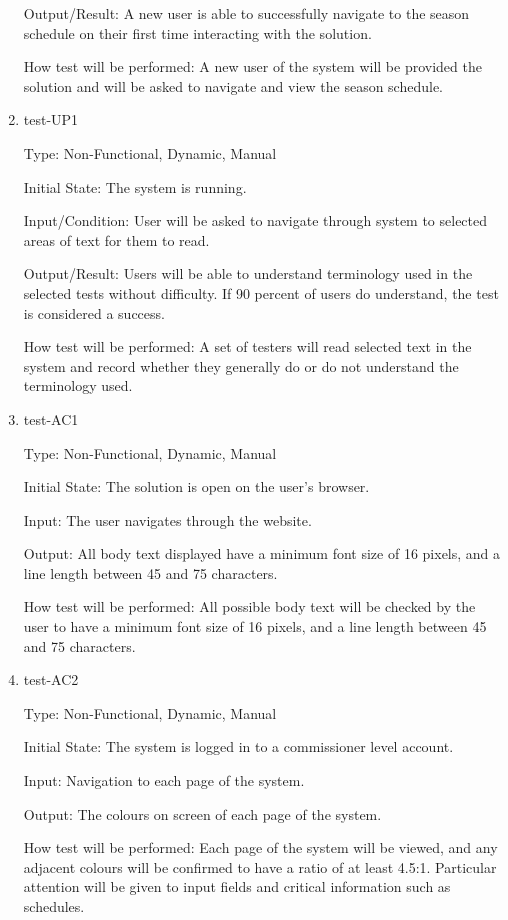 \documentclass[12pt, titlepage]{article}
\begin{document}
\begin{enumerate}
  Output/Result: A new user is able to successfully navigate to the season schedule on
  their first time interacting with the solution.

  How test will be performed: A new user of the system will be provided the solution and
  will be asked to navigate and view the season schedule.

  \item{test-UP1\\}

  Type: Non-Functional, Dynamic, Manual

  Initial State: The system is running.

  Input/Condition: User will be asked to navigate through system to 
  selected areas of text for them to read.

  Output/Result: Users will be able to understand terminology used in
  the selected tests without difficulty. If 90 percent of users do understand,
  the test is considered a success.

  How test will be performed: A set of testers will read selected text
  in the system and record whether they generally do or do not 
  understand the terminology used. 

  \item{test-AC1\\}

  Type: Non-Functional, Dynamic, Manual

  Initial State: The solution is open on the user's browser.

  Input: The user navigates through the website. 

  Output: All body text displayed have a minimum font size of 16 
  pixels, and a line length between 45 and 75 characters.

  How test will be performed: All possible body text will be checked by 
  the user to have a minimum font size of 16 pixels, and a line length 
  between 45 and 75 characters.

  \item{test-AC2\\}

  Type: Non-Functional, Dynamic, Manual

  Initial State: The system is logged in to a commissioner level account.

  Input: Navigation to each page of the system.

  Output: The colours on screen of each page of the system.

  How test will be performed: Each page of the system will be viewed, and any
  adjacent colours will be confirmed to have a ratio of at least 4.5:1.
  Particular attention will be given to input fields and critical information
  such as schedules.


\end{enumerate}
\end{document}
